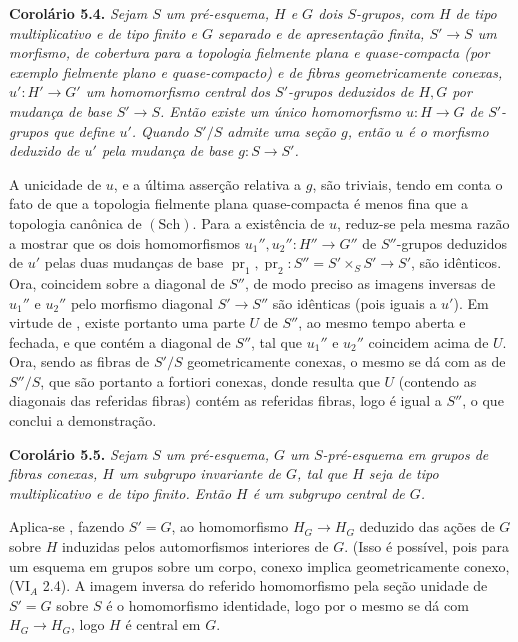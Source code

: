 \medskip
\noindent{}\textbf{Corolário 5.4.}
\textit{Sejam \(S\) um pré-esquema, \(H\) e \(G\) dois
\(S\)-grupos, com \(H\) de tipo multiplicativo e de tipo finito
e \(G\) separado e de apresentação finita, \(S'\to S\) um
morfismo, de cobertura para a topologia fielmente plana e
quase-compacta (por exemplo fielmente plano e quase-compacto)
e de fibras geometricamente conexas, \(u':H'\to G'\) um
homomorfismo central dos \(S'\)-grupos deduzidos de \(H,G\)
por mudança de base \(S'\to S\). Então existe um único
homomorfismo \(u:H\to G\) de \(S'\)-grupos que define \(u'\).
Quando \(S'/S\) admite uma seção \(g\), então \(u\) é o
morfismo deduzido de \(u'\) pela mudança de base \(g:S\to S'\).}

A unicidade de \(u\), e a última asserção relativa a \(g\),
são triviais, tendo em conta o fato de que a topologia fielmente
plana quase-compacta é menos fina que a topologia canônica de
\((\mathrm{Sch})\). Para a existência de \(u\), reduz-se pela
mesma razão a mostrar que os dois homomorfismos
\(u_1'',u_2'':H''\to G''\) de \(S''\)-grupos deduzidos de
\(u'\) pelas duas mudanças de base
\(\operatorname{pr}_1,\operatorname{pr}_2:
S''=S'\times_SS'\to S'\), são idênticos. Ora, coincidem sobre
a diagonal de \(S''\), de modo preciso as imagens inversas
de \(u_1''\) e \(u_2''\) pelo morfismo diagonal \(S'\to S''\)
são idênticas (pois iguais a \(u'\)). Em virtude de
, existe portanto uma
parte \(U\) de \(S''\), ao mesmo tempo aberta e fechada, e
que contém a diagonal de \(S''\), tal que \(u_1''\) e
\(u_2''\) coincidem acima de \(U\). Ora, sendo as fibras de
\(S'/S\) geometricamente conexas, o mesmo se dá com as de
\(S''/S\), que são portanto a fortiori conexas, donde resulta
que \(U\) (contendo as diagonais das referidas fibras) contém
as referidas fibras, logo é igual a \(S''\), o que conclui
a demonstração.

\medskip
\noindent{}\textbf{Corolário 5.5.}
\textit{Sejam \(S\) um pré-esquema, \(G\) um \(S\)-pré-esquema
em grupos de fibras conexas, \(H\) um subgrupo invariante de
\(G\), tal que \(H\) seja de tipo multiplicativo e de tipo
finito. Então \(H\) é um subgrupo central de \(G\).}

Aplica-se , fazendo
\(S'=G\), ao homomorfismo \(H_G\to H_G\) deduzido das ações
de \(G\) sobre \(H\) induzidas pelos automorfismos interiores
de \(G\). (Isso é possível, pois para um esquema em grupos
sobre um corpo, conexo implica geometricamente conexo,
(VI\(_A\) 2.4). A imagem inversa do referido homomorfismo
pela seção unidade de \(S'=G\) sobre \(S\) é o homomorfismo
identidade, logo por 
o mesmo se dá com \(H_G\to H_G\), logo \(H\) é central em \(G\).

